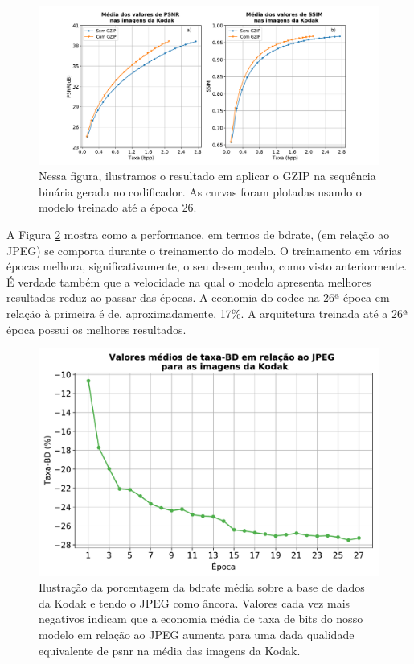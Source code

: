 \begin{figure}
	\centering
	\includegraphics[width=1.1\textwidth]{figuras/gain_gzip_media.pdf}
	\caption[Curvas antes e após codificação com o GZIP]{Nessa figura, ilustramos o resultado em aplicar o GZIP na sequência binária gerada no codificador. As curvas foram plotadas usando o modelo treinado até a época 26.}  	
	\label{fig:gain_gzip_meida}
\end{figure}

A Figura \ref{fig:taxa_bd} mostra como a performance, em termos de \acrshort{bdrate}, (em relação ao JPEG) se comporta durante o treinamento do modelo. O treinamento em várias épocas melhora, significativamente, o seu desempenho, como visto anteriormente. É verdade também que a velocidade na qual o modelo apresenta melhores resultados reduz ao passar das épocas. A economia do \acrshort{codec} na 26ª época em relação à primeira é de, aproximadamente, 17\%. 
A arquitetura treinada até a 26ª época possui os melhores resultados. 


\begin{figure}
	\centering
	\includegraphics[width=1\textwidth]{figuras/taxa_bd_27epocas.pdf}
	\caption[Curva de \acrshort{bdrate} por época de treinamento.]{Ilustração da porcentagem da \acrshort{bdrate} média sobre a base de dados da Kodak e tendo o JPEG como âncora.  Valores cada vez mais negativos indicam que a economia média de taxa de bits do nosso modelo em relação ao JPEG aumenta para uma dada qualidade equivalente de \acrshort{psnr} na média das imagens da Kodak.}  
	\label{fig:taxa_bd}
\end{figure}	


